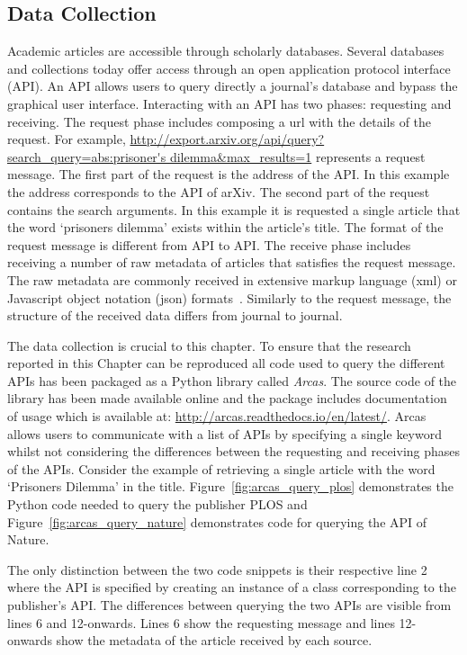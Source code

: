 \subsection{Data Collection}\label{section:data_collection_arcas}

Academic articles are accessible through scholarly databases. Several databases
and collections today offer access through an open application protocol
interface (API). An API allows users to query directly a journal's database and
bypass the graphical user interface. Interacting with an API has two phases:
requesting and receiving. The request phase includes composing a url with the
details of the request. For example,
\url{http://export.arxiv.org/api/query?search_query=abs:prisoner's
dilemma&max_results=1} represents a request message. The first part of the
request is the address of the API. In this example the address corresponds to
the API of arXiv. The second part of the request contains the search arguments.
In this example it is requested a single article that the word `prisoners dilemma' exists within
the article's title. The format of the request message is different from API to
API. The receive phase includes receiving a number of raw metadata of articles
that satisfies the request message. The raw metadata are commonly received in
extensive markup language (xml) or Javascript object notation (json)
formats~\cite{nurseitov2009}. Similarly to the request message, the structure of
the received data differs from journal
to journal.

The data collection is crucial to this chapter. To ensure that the research
reported in this Chapter can be reproduced all code used to query the different
APIs has been packaged as a Python library called \textit{Arcas}. The source
code of the library has been made available online and the package includes
documentation of usage which is available at:
\url{http://arcas.readthedocs.io/en/latest/}. Arcas allows users to communicate
with a list of APIs by specifying a single keyword whilst not considering the
differences between the requesting and receiving phases of the APIs. Consider
the example of retrieving a single article with the word `Prisoners Dilemma' in
the title. Figure~\ref{fig:arcas_query_plos} demonstrates the Python code needed
to query the publisher PLOS and Figure~\ref{fig:arcas_query_nature} demonstrates 
code for querying the API of Nature.

The only distinction between the two code snippets is their respective line 2
where the API is specified by creating an instance of a class corresponding
to the publisher's API. The differences between querying the two APIs are visible from
lines 6 and 12-onwards. Lines 6 show the requesting message and lines 12-onwards
show the metadata of the article received by each source.

